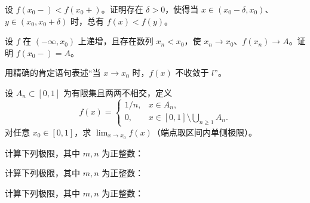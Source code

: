 \noindent\begin{minipage}{\textwidth}
设 $f(x_0-)<f(x_0+)$。证明存在 $\delta>0$，使得当 $x\in(x_0-\delta,x_0)$、$y\in(x_0,x_0+\delta)$ 时，总有 $f(x)<f(y)$。
\end{minipage}\par\vfill
\newpage
\noindent\begin{minipage}{\textwidth}
设 $f$ 在 $(-\infty,x_0)$ 上递增，且存在数列 $x_n<x_0$，使 $x_n\to x_0$、$f(x_n)\to A$。证明 $f(x_0-)=A$。
\end{minipage}\par\vfill
\noindent\begin{minipage}{\textwidth}
用精确的肯定语句表述“当 $x\to x_0$ 时，$f(x)$ 不收敛于 $l$”。
\end{minipage}\par\vfill
\noindent\begin{minipage}{\textwidth}
设 $A_n\subset[0,1]$ 为有限集且两两不相交，定义\[f(x)=\begin{cases}1/n,&x\in A_n,\\0,&x\in[0,1]\setminus\bigcup_{n\ge1}A_n.\end{cases}\]对任意 $x_0\in[0,1]$，求 $\lim_{x\to x_0}f(x)$（端点取区间内单侧极限）。
\end{minipage}\par\vfill
\newpage
\noindent\begin{minipage}{\textwidth}
计算下列极限，其中 $m,n$ 为正整数：
\end{minipage}\par\vfill
\noindent\begin{minipage}{\textwidth}
计算下列极限，其中 $m,n$ 为正整数：
\end{minipage}\par\vfill
\noindent\begin{minipage}{\textwidth}
计算下列极限，其中 $m,n$ 为正整数：
\end{minipage}\par\vfill
